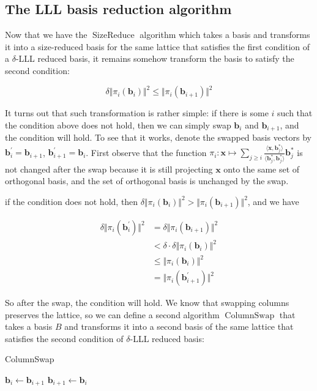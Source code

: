 \subsection{The LLL basis reduction algorithm}
Now that we have the $\operatorname{SizeReduce}$ algorithm which takes a basis and transforms it into a size-reduced basis for the same lattice that satisfies the first condition of a $\delta$-LLL reduced basis, it remains somehow transform the basis to satisfy the second condition:

$$
\delta \Vert \pi_i(\mathbf{b}_i) \Vert^2 \leq \Vert \pi_i(\mathbf{b}_{i+1})\Vert^2
$$

It turns out that such transformation is rather simple: if there is some $i$ such that the condition above does not hold, then we can simply swap $\mathbf{b}_i$ and $\mathbf{b}_{i+1}$, and the condition will hold. To see that it works, denote the swapped basis vectors by $\mathbf{b}_i^\prime = \mathbf{b}_{i+1}$, $\mathbf{b}_{i+1}^\prime = \mathbf{b}_{i}$. First observe that the function $\pi_i: \mathbf{x} \mapsto \sum_{j\geq i}\frac{\langle \mathbf{x}, \mathbf{b}_j^\ast \rangle}{\langle \mathbf{b}_j^\ast, \mathbf{b}_j^\ast \rangle}\mathbf{b}_j^\ast$ is not changed after the swap because it is still projecting $\mathbf{x}$ onto the same set of orthogonal basis, and the set of orthogonal basis is unchanged by the swap.

if the condition does not hold, then $\delta\Vert\pi_i(\mathbf{b}_i)\Vert^2 > \Vert\pi_i(\mathbf{b}_{i+1})\Vert^2$, and we have

$$
\begin{aligned}
\delta \Vert\pi_i(\mathbf{b}_i^\prime)\Vert^2
&= \delta \Vert\pi_i(\mathbf{b}_{i+1})\Vert^2 \\
&< \delta \cdot \delta\Vert\pi_i(\mathbf{b}_i)\Vert^2 \\
&\leq \Vert\pi_i(\mathbf{b}_i)\Vert^2 \\
&= \Vert\pi_i(\mathbf{b}_{i+1}^\prime)\Vert^2
\end{aligned}
$$

So after the swap, the condition will hold. We know that swapping columns preserves the lattice, so we can define a second algorithm $\operatorname{ColumnSwap}$ that takes a basis $B$ and transforms it into a second basis of the same lattice that satisfies the second condition of $\delta$-LLL reduced basis:

\begin{algorithm}
\caption{ColumnSwap}
\begin{algorithmic}[1]
            \State $\mathbf{b}_i \leftarrow \mathbf{b}_{i+1}$
            \State $\mathbf{b}_{i+1} \leftarrow \mathbf{b}_{i}$
        \EndIf
    \EndFor
\end{algorithmic}
\end{algorithm}

